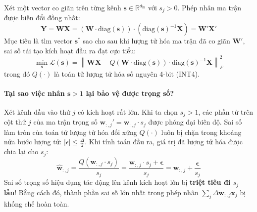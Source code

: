 Xét một vector co giãn trên từng kênh $\mathbf{s} \in \mathbb{R}^{d_{\text{in}}}$ với $s_j > 0$. Phép nhân ma trận được biến đổi đồng nhất:
\begin{equation}
\mathbf{Y} = \mathbf{W} \mathbf{X} = \left( \mathbf{W} \cdot \text{diag}(\mathbf{s}) \right) \cdot \left( \text{diag}(\mathbf{s})^{-1} \mathbf{X} \right) = \mathbf{W}' \mathbf{X}'
\end{equation}
Mục tiêu là tìm vector $\mathbf{s}^*$ sao cho sau khi lượng tử hóa ma trận đã co giãn $\mathbf{W}'$, sai số tái tạo kích hoạt đầu ra đạt cực tiểu:
\begin{equation}
\label{eq:awq-optimization-objective}
\min_{\mathbf{s}} \mathcal{L}(\mathbf{s}) = \left\| \mathbf{W} \mathbf{X} - Q\left(\mathbf{W} \cdot \text{diag}(\mathbf{s})\right) \cdot \text{diag}(\mathbf{s})^{-1} \mathbf{X} \right\|_F^2
\end{equation}
trong đó $Q(\cdot)$ là toán tử lượng tử hóa số nguyên 4-bit (INT4).

\paragraph{Tại sao việc nhân $\mathbf{s} > 1$ lại bảo vệ được trọng số?}
Xét kênh đầu vào thứ $j$ có kích hoạt rất lớn. Khi ta chọn $s_j > 1$, các phần tử trên cột thứ $j$ của ma trận trọng số $\mathbf{w}_{:, j}' = \mathbf{w}_{:, j} \cdot s_j$ được phóng đại biên độ.
Sai số làm tròn của toán tử lượng tử hóa đối xứng $Q(\cdot)$ luôn bị chặn trong khoảng nửa bước lượng tử: $|\epsilon| \le \frac{\Delta}{2}$.
Khi tính toán đầu ra, giá trị đã lượng tử hóa được chia lại cho $s_j$:
\begin{equation}
\widehat{\mathbf{w}}_{:, j} = \frac{Q(\mathbf{w}_{:, j} \cdot s_j)}{s_j} = \frac{\mathbf{w}_{:, j} \cdot s_j + \boldsymbol{\epsilon}}{s_j} = \mathbf{w}_{:, j} + \frac{\boldsymbol{\epsilon}}{s_j}
\end{equation}
Sai số trọng số hiệu dụng tác động lên kênh kích hoạt lớn bị \textbf{triệt tiêu đi $s_j$ lần}! Bằng cách đó, thành phần sai số lớn nhất trong phép nhân $\sum_j \Delta \mathbf{w}_{:, j} \mathbf{x}_j$ bị khống chế hoàn toàn.

